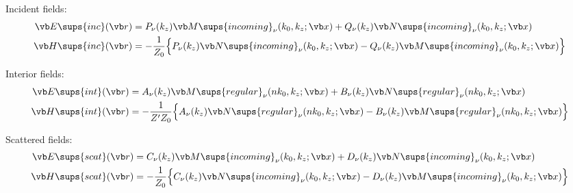\documentclass[letterpaper]{article}
\begin{document}
Incident fields:
\begin{align*}
 \vb E\sups{inc}(\vb r) 
   &=   P_\nu(k_z) \vb M\sups{incoming}_\nu(k_0, k_z; \vb x)
      + Q_\nu(k_z) \vb N\sups{incoming}_\nu(k_0, k_z; \vb x)
\\
 \vb H\sups{inc}(\vb r)
   &= -\frac{1}{Z_0}
      \Big\{
      P_\nu(k_z) \vb N\sups{incoming}_\nu(k_0, k_z; \vb x)
    - Q_\nu(k_z) \vb M\sups{incoming}_\nu(k_0, k_z; \vb x)
      \Big\}
\\
\end{align*}

Interior fields:
\begin{align*}
 \vb E\sups{int}(\vb r) 
   &=   A_\nu(k_z) \vb M\sups{regular}_\nu(nk_0, k_z; \vb x)
      + B_\nu(k_z) \vb N\sups{regular}_\nu(nk_0, k_z; \vb x)
\\
 \vb H\sups{int}(\vb r)
   &= -\frac{1}{Z^\prime Z_0}
      \Big\{
      A_\nu(k_z) \vb N\sups{regular}_\nu(n k_0, k_z; \vb x)
    - B_\nu(k_z) \vb M\sups{regular}_\nu(n k_0, k_z; \vb x)
      \Big\}
\\
\end{align*}

Scattered fields:
\begin{align*}
 \vb E\sups{scat}(\vb r) 
   &=   C_\nu(k_z) \vb M\sups{incoming}_\nu(k_0, k_z; \vb x)
      + D_\nu(k_z) \vb N\sups{incoming}_\nu(k_0, k_z; \vb x)
\\
 \vb H\sups{scat}(\vb r)
   &= -\frac{1}{Z_0}
      \Big\{
      C_\nu(k_z) \vb N\sups{incoming}_\nu(k_0, k_z; \vb x)
    - D_\nu(k_z) \vb M\sups{incoming}_\nu(k_0, k_z; \vb x)
      \Big\}
\end{align*}
\end{document}
